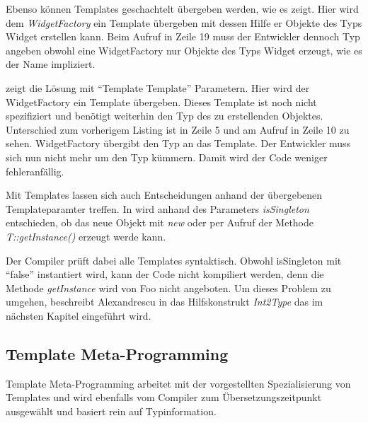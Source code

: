

Ebenso können Templates geschachtelt übergeben werden, wie es  zeigt. Hier wird dem \emph{WidgetFactory} ein Template übergeben mit dessen Hilfe er Objekte des Typs Widget erstellen kann. Beim Aufruf in Zeile 19 muss der Entwickler dennoch Typ angeben obwohl eine WidgetFactory nur Objekte des Typs Widget erzeugt, wie es der Name impliziert.



 zeigt die Lösung mit ``Template Template'' Parametern. Hier wird der WidgetFactory ein Template übergeben. Dieses Template ist noch nicht spezifiziert und benötigt weiterhin den Typ des zu erstellenden Objektes. Unterschied zum vorherigem Listing ist in Zeile 5 und am Aufruf in Zeile 10 zu sehen. WidgetFactory übergibt den Typ an das Template. Der Entwickler muss sich nun nicht mehr um den Typ kümmern. Damit wird der Code weniger fehleranfällig.



Mit Templates lassen sich auch Entscheidungen anhand der übergebenen Templateparamter treffen. In  wird anhand des Parameters \emph{isSingleton} entschieden, ob das neue Objekt mit \emph{new} oder per Aufruf der Methode \emph{T::getInstance()} erzeugt werde kann.



Der Compiler prüft dabei alle Templates syntaktisch. Obwohl isSingleton mit ``false'' instantiert wird, kann der Code nicht kompiliert werden, denn die Methode \emph{getInstance} wird von Foo nicht angeboten. Um dieses Problem zu umgehen, beschreibt Alexandrescu in \cite{Alexandrescu2001Modern} das Hilfskonstrukt \emph{Int2Type} das im nächsten Kapitel eingeführt wird.

\subsection{Template Meta-Programming}
Template Meta-Programming arbeitet mit der vorgestellten Spezialisierung von Templates und wird ebenfalls vom Compiler zum Übersetzungszeitpunkt ausgewählt und basiert rein auf Typinformation.

